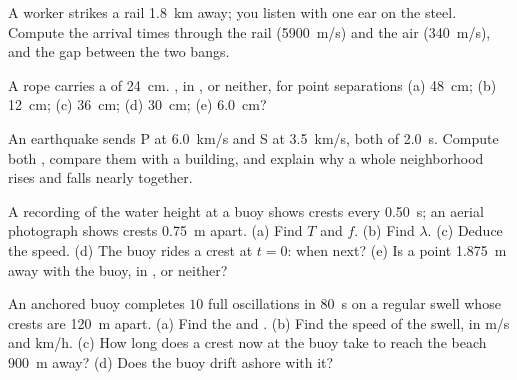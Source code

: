 \begin{exercise}[$\star\star$]\label{exo:g12:mechanical-waves:9}
A worker strikes a rail \qty{1.8}{km} away; you listen with one ear on
the steel. Compute the arrival times through the rail (\qty{5900}{m/s})
and the air (\qty{340}{m/s}), and the gap between the two bangs.
\end{exercise}

\begin{exercise}[$\star\star$]\label{exo:g12:mechanical-waves:10}
A rope carries a  of  \qty{24}{cm}. ,
in , or neither, for point separations (a) \qty{48}{cm};
(b) \qty{12}{cm}; (c) \qty{36}{cm}; (d) \qty{30}{cm}; (e) \qty{6.0}{cm}?
\end{exercise}

\begin{exercise}[$\star\star$]\label{exo:g12:mechanical-waves:11}
An earthquake sends P  at \qty{6.0}{km/s} and S  at
\qty{3.5}{km/s}, both of  \qty{2.0}{s}. Compute both ,
compare them with a building, and explain why a whole neighborhood
rises and falls nearly together.
\end{exercise}

\begin{exercise}[$\star\star\star$]\label{exo:g12:mechanical-waves:12}
A recording of the water height at a buoy shows crests every
\qty{0.50}{s}; an aerial photograph shows crests \qty{0.75}{m} apart.
(a) Find $T$ and $f$. (b) Find $\lambda$. (c) Deduce the speed. (d) The
buoy rides a crest at $t = 0$: when next? (e) Is a point \qty{1.875}{m}
away  with the buoy, in , or neither?
\end{exercise}

\begin{exercise}[$\star\star\star$]\label{exo:g12:mechanical-waves:13}
An anchored buoy completes $10$ full oscillations in \qty{80}{s} on a
regular swell whose crests are \qty{120}{m} apart. (a) Find the  and
. (b) Find the speed of the swell, in \unit{m/s} and
\unit{km/h}. (c) How long does a crest now at the buoy take to reach
the beach \qty{900}{m} away? (d) Does the buoy drift ashore with it?
\end{exercise}

